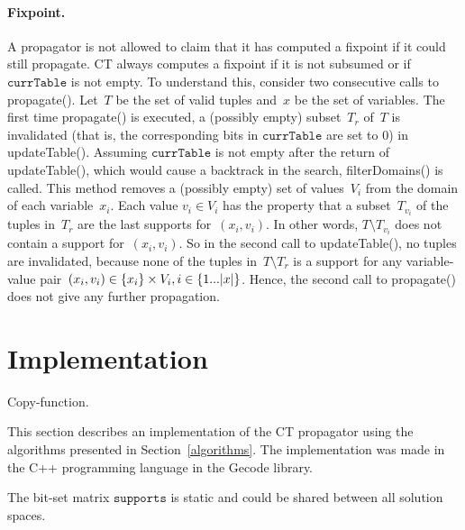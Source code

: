 \documentclass[a4paper,11pt]{article}
\newcommand{\Todo}[1]{{\color{blue}#1}}
\newcommand{\Chapref}[1]{Section~\ref{#1}}
\newcommand{\CurrTable}{\texttt{currTable}}
\newcommand{\Supports}{\texttt{supports}}
\numberwithin{equation}{section}
\begin{document}
\paragraph{Fixpoint.}
A propagator is not allowed to claim that it has computed a fixpoint if
it could still propagate.
CT always computes a fixpoint if it is not subsumed or if~$\CurrTable$
is not empty.
To understand this, consider two consecutive calls to propagate().
Let~$T$ be the set of valid tuples and~$x$ be the set of variables.
The first time propagate() is executed, a (possibly empty) subset~$T_r$ of~$T$
is invalidated (that is, the corresponding bits in $\CurrTable$ are set to $0$)
in updateTable().
Assuming $\CurrTable$ is not empty after the return of updateTable(), which would
cause a backtrack in the search, filterDomains() is called.
This method removes a (possibly empty) set of values~$V_i$ from the domain 
of each variable~$x_i$.
Each value $v_i \in V_i$ has the property that a subset~$T_{v_i}$ 
of the tuples in~$T_r$ are the last supports for~$(x_i,v_i)$. In other words,
$T \setminus T_{v_i}$ does not contain a support for~$(x_i,v_i)$.
So in the second call to updateTable(), no tuples are invalidated,
because none of the tuples in~$T \setminus T_r$ is a support for any variable-value
pair~$(x_i, v_i) \in \left\{x_i\right\} \times V_i, i \in \left\{1...|x|\right\}$.
Hence, the second call to propagate() does not give
any further propagation.

\section{Implementation}
\label{sec:implementation}

\Todo{Copy-function.}




This section describes an implementation of the CT propagator using the algorithms
presented in \Chapref{algorithms}. The implementation was made in the C++ programming
language in the Gecode library.

The bit-set matrix $\Supports$ is static and could be shared between all solution spaces.
\end{document}
